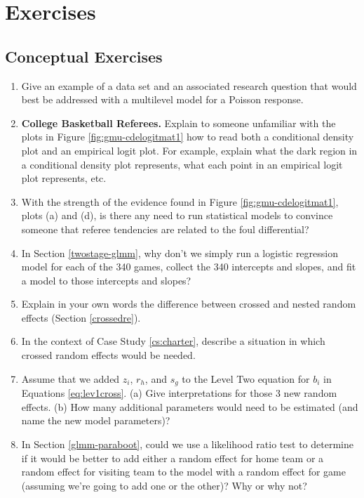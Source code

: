 \documentclass[
]{krantz}
\begin{document}
\hypertarget{exercises-9}{%
\section{Exercises}\label{exercises-9}}

\hypertarget{conceptual-exercises-7}{%
\subsection{Conceptual Exercises}\label{conceptual-exercises-7}}

\begin{enumerate}
\def\labelenumi{\arabic{enumi}.}
\item
  Give an example of a data set and an associated research question that would best be addressed with a multilevel model for a Poisson response.
\item
  \textbf{College Basketball Referees.} Explain to someone unfamiliar with the plots in Figure \ref{fig:gmu-cdelogitmat1} how to read both a conditional density plot and an empirical logit plot. For example, explain what the dark region in a conditional density plot represents, what each point in an empirical logit plot represents, etc.
\item
  With the strength of the evidence found in Figure \ref{fig:gmu-cdelogitmat1}, plots (a) and (d), is there any need to run statistical models to convince someone that referee tendencies are related to the foul differential?
\item
  In Section \ref{twostage-glmm}, why don't we simply run a logistic regression model for each of the 340 games, collect the 340 intercepts and slopes, and fit a model to those intercepts and slopes?
\item
  Explain in your own words the difference between crossed and nested random effects (Section \ref{crossedre}).
\item
  In the context of Case Study \ref{cs:charter}, describe a situation in which crossed random effects would be needed.
\item
  Assume that we added \(z_{i}\), \(r_{h}\), and \(s_{g}\) to the Level Two equation for \(b_{i}\) in Equations \eqref{eq:lev1cross}. (a) Give interpretations for those 3 new random effects. (b) How many additional parameters would need to be estimated (and name the new model parameters)?
\item
  In Section \ref{glmm-paraboot}, could we use a likelihood ratio test to determine if it would be better to add either a random effect for home team or a random effect for visiting team to the model with a random effect for game (assuming we're going to add one or the other)? Why or why not?

\end{enumerate}
\end{document}
